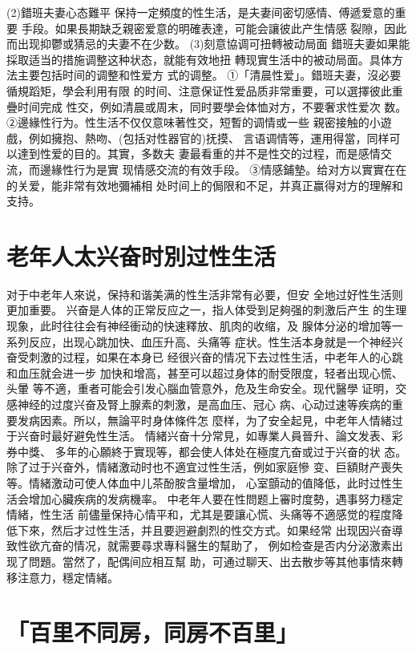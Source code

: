 \documentclass[12pt,UTF8]{ctexbook}
\begin{document}
(2)錯班夫妻心态難平
保持一定頻度的性生活，是夫妻间密切感情、傅遞爱意的重要
手段。如果長期缺乏親密爱意的明確表達，可能会讓彼此产生情感
裂隙，因此而出现抑鬱或猜忌的夫妻不在少数。
(3)刻意協调可扭轉被动局面
錯班夫妻如果能採取适当的措施调整这种状态，就能有效地扭
轉现實生活中的被动局面。具体方法主要包括时间的调整和性爱方
式的调整。
①「清晨性爱」。錯班夫妻，沒必要循規蹈矩，學会利用有限
的时间、注意保证性爱品质非常重要，可以選擇彼此重疊时间完成
性交，例如清晨或周末，同时要學会体恤对方，不要奢求性爱次
数。
②邊緣性行为。性生活不仅仅意味著性交，短暫的调情或一些
親密接触的小遊戲，例如擁抱、熱吻、(包括对性器官的)抚摸、
言语调情等，運用得當，同样可以達到性爱的目的。其實，多数夫
妻最看重的并不是性交的过程，而是感情交流，而邊緣性行为是實
现情感交流的有效手段。
③情感鋪墊。给对方以實實在在的关爱，能非常有效地彌補相
处时间上的侷限和不足，并真正赢得对方的理解和支持。


\section{老年人太兴奋时別过性生活}

对于中老年人來说，保持和谐美满的性生活非常有必要，但安
全地过好性生活则更加重要。
兴奋是人体的正常反应之一，指人体受到足夠强的刺激后产生
的生理现象，此时往往会有神经衝动的快速釋放、肌肉的收缩，及
腺体分泌的增加等一系列反应，出现心跳加快、血压升高、头痛等
症状。性生活本身就是一个神经兴奋受刺激的过程，如果在本身已
经很兴奋的情况下去过性生活，中老年人的心跳和血压就会进一步
加快和增高，甚至可以超过身体的耐受限度，轻者出现心慌、头暈
等不適，重者可能会引发心腦血管意外，危及生命安全。现代醫學
证明，交感神经的过度兴奋及腎上腺素的刺激，是高血压、冠心
病、心动过速等疾病的重要发病因素。所以，無論平时身体條件怎
麼样，为了安全起見，中老年人情緒过于兴奋时最好避免性生活。
情緒兴奋十分常見，如專業人員晉升、論文发表、彩券中獎、
多年的心願終于實现等，都会使人体处在極度亢奋或过于兴奋的状
态。除了过于兴奋外，情緒激动时也不適宜过性生活，例如家庭慘
变、巨額財产喪失等。情緒激动可使人体血中儿茶酚胺含量增加，
心室顫动的值降低，此时过性生活会增加心臟疾病的发病機率。
中老年人要在性問题上審时度勢，遇事努力穩定情緒，性生活
前儘量保持心情平和，尤其是要讓心慌、头痛等不適感觉的程度降
低下來，然后才过性生活，并且要迥避劇烈的性交方式。如果经常
出现因兴奋導致性欲亢奋的情况，就需要尋求專科醫生的幫助了，
例如检查是否内分泌激素出现了問題。當然了，配偶间应相互幫
助，可通过聊天、出去散步等其他事情來轉移注意力，穩定情緒。

\section{「百里不同房，同房不百里」}
\end{document}
